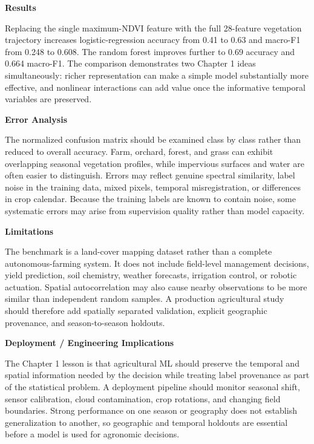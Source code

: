 \textbf{Results}

Replacing the single maximum-NDVI feature with the full 28-feature vegetation trajectory increases logistic-regression accuracy from 0.41 to 0.63 and macro-F1 from 0.248 to 0.608. The random forest improves further to 0.69 accuracy and 0.664 macro-F1. The comparison demonstrates two Chapter 1 ideas simultaneously: richer representation can make a simple model substantially more effective, and nonlinear interactions can add value once the informative temporal variables are preserved.

\textbf{Error Analysis}

The normalized confusion matrix should be examined class by class rather than reduced to overall accuracy. Farm, orchard, forest, and grass can exhibit overlapping seasonal vegetation profiles, while impervious surfaces and water are often easier to distinguish. Errors may reflect genuine spectral similarity, label noise in the training data, mixed pixels, temporal misregistration, or differences in crop calendar. Because the training labels are known to contain noise, some systematic errors may arise from supervision quality rather than model capacity.

\textbf{Limitations}

The benchmark is a land-cover mapping dataset rather than a complete autonomous-farming system. It does not include field-level management decisions, yield prediction, soil chemistry, weather forecasts, irrigation control, or robotic actuation. Spatial autocorrelation may also cause nearby observations to be more similar than independent random samples. A production agricultural study should therefore add spatially separated validation, explicit geographic provenance, and season-to-season holdouts.

\textbf{Deployment / Engineering Implications}

The Chapter 1 lesson is that agricultural ML should preserve the temporal and spatial information needed by the decision while treating label provenance as part of the statistical problem. A deployment pipeline should monitor seasonal shift, sensor calibration, cloud contamination, crop rotations, and changing field boundaries. Strong performance on one season or geography does not establish generalization to another, so geographic and temporal holdouts are essential before a model is used for agronomic decisions.
